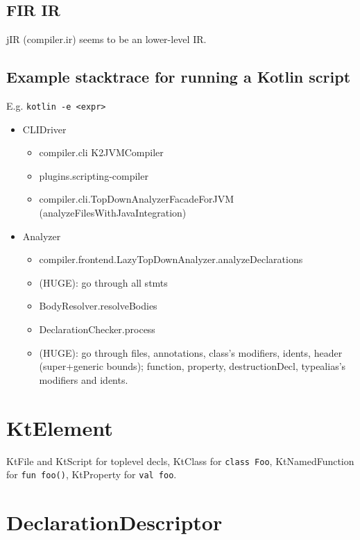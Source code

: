 \documentclass{article}
\begin{document}
\subsection{FIR \textSafeTo IR}

jIR (compiler.ir) seems to be an lower-level IR.

\subsection{Example stacktrace for running a Kotlin script}

E.g. \texttt{kotlin -e <expr>}

\begin{itemize}
    \item CLIDriver
    \begin{itemize}
        \item compiler.cli K2JVMCompiler
        \item plugins.scripting-compiler
        \item compiler.cli.TopDownAnalyzerFacadeForJVM (analyzeFilesWithJavaIntegration)
    \end{itemize}
    \item Analyzer
    \begin{itemize}
        \item compiler.frontend.LazyTopDownAnalyzer.analyzeDeclarations
        \item (HUGE): go through all stmts
        \item BodyResolver.resolveBodies
        \item DeclarationChecker.process
        \item (HUGE): go through files, annotations, class's modifiers, idents, header (super+generic bounds); function, property, destructionDecl, typealias's modifiers and idents.
    \end{itemize}
\end{itemize}

\section{KtElement}

KtFile and KtScript for toplevel decls,
KtClass for \texttt{class Foo}, KtNamedFunction for \texttt{fun foo()}, KtProperty for \texttt{val foo}.

\section{DeclarationDescriptor}
\end{document}
